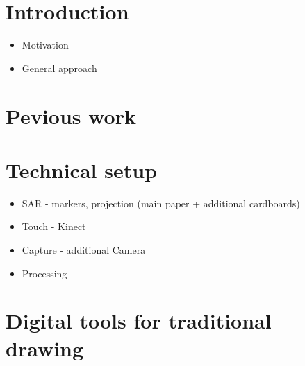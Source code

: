 \documentclass{sigchi}
\begin{document}
\section{Introduction}


\begin{itemize}
\item Motivation
\item General approach 
\end{itemize}


\section{Pevious work}


\section{Technical setup}
\begin{itemize}
\item SAR - markers, projection  (main paper + additional cardboards)
\item Touch - Kinect
\item Capture - additional Camera	 
\item Processing
\end{itemize}


\section{Digital tools for traditional drawing}


\end{document}
